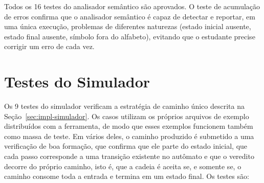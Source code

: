 \documentclass[
    12pt
    ,oneside
    ,a4paper
    ,chapter=TITLE
    ,section=TITLE
    ,sumario=abnt-6027-2012]{abntex2}
\begin{document}
Todos os 16 testes do analisador semântico são aprovados. O teste de acumulação de
erros confirma que o analisador semântico é capaz de detectar e reportar, em uma única
execução, problemas de diferentes naturezas (estado inicial ausente, estado final
ausente, símbolo fora do alfabeto), evitando que o estudante precise corrigir um erro
de cada vez.

\section{Testes do Simulador}
\label{sec:res-simulador}

Os 9 testes do simulador verificam a estratégia de caminho único descrita na
Seção~\ref{sec:impl-simulador}. Os casos utilizam os próprios arquivos de exemplo
distribuídos com a ferramenta, de modo que esses exemplos funcionem também como massa
de teste. Em vários deles, o caminho produzido é submetido a uma verificação de boa
formação, que confirma que ele parte do estado inicial, que cada passo corresponde a uma
transição existente no autômato e que o veredito decorre do próprio caminho, isto é, que
a cadeia é aceita se, e somente se, o caminho consome toda a entrada e termina em um
estado final. Os testes são:
\end{document}
